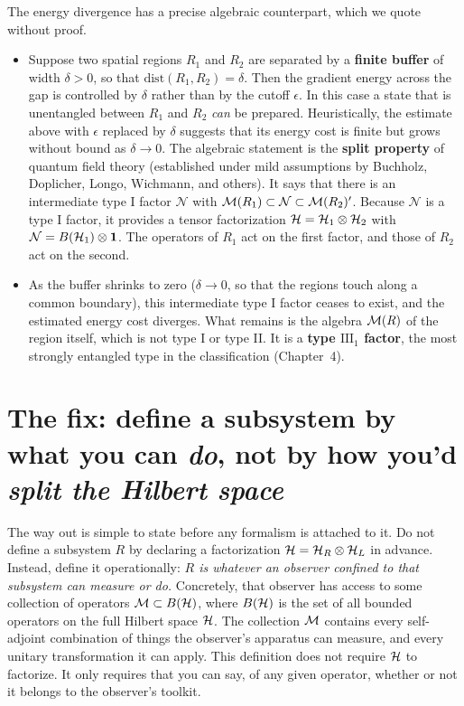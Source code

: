 The energy divergence has a precise algebraic counterpart, which we quote without proof.
\begin{itemize}
\item Suppose two spatial regions $R_1$ and $R_2$ are separated by a \textbf{finite buffer} of width
$\delta > 0$, so that $\text{dist}(R_1, R_2) = \delta$. Then the gradient energy across the gap is controlled
by $\delta$ rather than by the cutoff $\epsilon$. In this case a state that is unentangled between $R_1$ and
$R_2$ \emph{can} be prepared. Heuristically, the estimate above with $\epsilon$ replaced by $\delta$ suggests
that its energy cost is finite but grows without bound as $\delta\to0$. The algebraic statement is the
\textbf{split property} of quantum field theory (established under mild assumptions by Buchholz,
Doplicher, Longo, Wichmann, and others). It says that there is an intermediate type I factor $\mathcal{N}$
with $\mathcal{M}(R_1) \subset \mathcal{N} \subset \mathcal{M}(R_2)'$. Because $\mathcal N$ is a type I factor, it provides a tensor factorization
$\mathcal{H}=\mathcal{H}_1\otimes\mathcal{H}_2$ with $\mathcal N=B(\mathcal{H}_1)\otimes\mathbf{1}$. The operators of $R_1$ act on the first factor,
and those of $R_2$ act on the second.
\item As the buffer shrinks to zero ($\delta \to 0$, so that the regions touch along a common boundary), this
intermediate type I factor ceases to exist, and the estimated energy cost diverges. What remains is the
algebra $\mathcal{M}(R)$ of the region itself, which is not type I or type II. It is a \textbf{type $\mathrm{III}_1$
factor}, the most strongly entangled type in the classification (Chapter~4).
\end{itemize}

\section{The fix: define a subsystem by what you can \emph{do}, not by how you'd \emph{split the Hilbert
space}}

The way out is simple to state before any formalism is attached to it. Do not define a subsystem $R$ by
declaring a factorization $\mathcal{H}=\mathcal{H}_R\otimes\mathcal{H}_L$ in advance. Instead, define it operationally: \emph{$R$ is
whatever an observer confined to that subsystem can measure or do.} Concretely, that observer has access to
some collection of operators $\mathcal{M}\subset B(\mathcal{H})$, where $B(\mathcal{H})$ is the set of all bounded operators on the
full Hilbert space $\mathcal{H}$. The collection $\mathcal{M}$ contains every self-adjoint combination of things the
observer's apparatus can measure, and every unitary transformation it can apply. This definition does not
require $\mathcal{H}$ to factorize. It only requires that you can say, of any given operator, whether or not it
belongs to the observer's toolkit.


